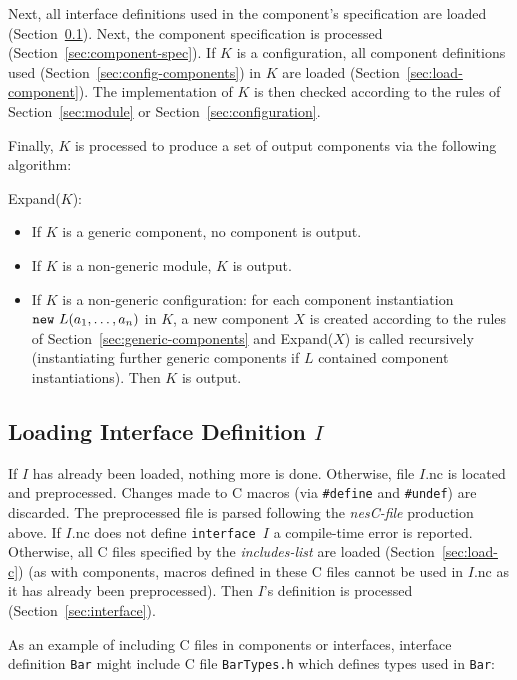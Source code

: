 \documentclass[11pt,letterpaper]{article}
\newcommand{\kw}[1]{{\tt #1}}
\newcommand{\code}[1]{{\tt #1}}
\newcommand{\file}[1]{{\tt #1}}
\begin{document}
Next, all interface definitions used in the component's specification are
loaded (Section~\ref{sec:load-intf}). Next, the component specification is
processed (Section~\ref{sec:component-spec}). If $K$ is a configuration, all
component definitions used (Section~\ref{sec:config-components}) in $K$ are
loaded (Section~\ref{sec:load-component}). The implementation of $K$ is
then checked according to the rules of Section~\ref{sec:module} or
Section~\ref{sec:configuration}.

Finally, $K$ is processed to produce a set of output components via the
following algorithm:

Expand($K$):
\begin{itemize}
\item If $K$ is a generic component, no component is output.

\item If $K$ is a non-generic module, $K$ is output.

\item If $K$ is a non-generic configuration: for each component
instantiation $\kw{new}\ L(a_1, \ldots, a_n)$ in $K$, a new component $X$ is
created according to the rules of Section~\ref{sec:generic-components} and
Expand($X$) is called recursively (instantiating further generic components
if $L$ contained component instantiations). Then $K$ is output.
\end{itemize}

\subsection{Loading Interface Definition $I$}
\label{sec:load-intf}

If $I$ has already been loaded, nothing more is done. Otherwise, file
$I$.nc is located and preprocessed. Changes made to C macros (via
\code{\#define} and \code{\#undef}) are discarded. The preprocessed file is
parsed following the \emph{nesC-file} production above. If $I$.nc does not
define \code{interface $I$} a compile-time error is reported. Otherwise,
all C files specified by the \emph{includes-list} are loaded
(Section~\ref{sec:load-c}) (as with components, macros defined in these C
files cannot be used in $I$.nc as it has already been preprocessed). Then
$I$'s definition is processed (Section~\ref{sec:interface}).

As an example of including C files in components or interfaces, interface
definition \code{Bar} might include C file \file{BarTypes.h} which defines types
used in \code{Bar}:
\end{document}
